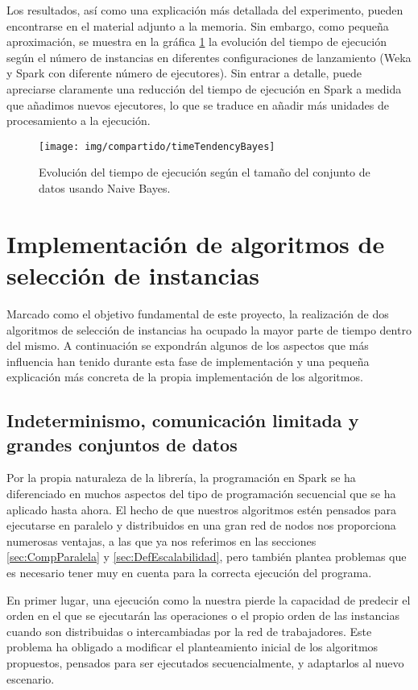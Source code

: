 Los resultados, así como una explicación más detallada del experimento, pueden encontrarse en el material adjunto a la memoria. Sin embargo, como pequeña aproximación, se muestra en la gráfica \ref{fig:img/compartido/timeTendencyBayes} la evolución del tiempo de ejecución según el número de instancias en diferentes configuraciones de lanzamiento (Weka y Spark con diferente número de ejecutores). Sin entrar a detalle, puede apreciarse claramente una reducción del tiempo de ejecución en Spark a medida que añadimos nuevos ejecutores, lo que se traduce en añadir más unidades de procesamiento a la ejecución. 

	\begin{figure}[!h]
		\centering
		\texttt{[image: img/compartido/timeTendencyBayes]}
		\caption{Evolución del tiempo de ejecución según el tamaño del conjunto de datos usando Naive Bayes.}\label{fig:img/compartido/timeTendencyBayes}
	\end{figure}

\section{Implementación de algoritmos de selección de instancias}

Marcado como el objetivo fundamental de este proyecto, la realización de dos algoritmos de selección de instancias ha ocupado la mayor parte de tiempo dentro del mismo. A continuación se expondrán algunos de los aspectos que más influencia han tenido durante esta fase de implementación y una pequeña explicación más concreta de la propia implementación de los algoritmos.


\subsection{Indeterminismo, comunicación limitada y grandes conjuntos de datos}

Por la propia naturaleza de la librería, la programación en Spark se ha diferenciado en muchos aspectos del tipo de programación secuencial que se ha aplicado hasta ahora. El hecho de que nuestros algoritmos estén pensados para ejecutarse en paralelo y distribuidos en una gran red de nodos nos proporciona numerosas ventajas, a las que ya nos referimos en las secciones \ref{sec:CompParalela} y \ref{sec:DefEscalabilidad}, pero también plantea problemas que es necesario tener muy en cuenta para la correcta ejecución del programa.

En primer lugar, una ejecución como la nuestra pierde la capacidad de predecir el orden en el que se ejecutarán las operaciones o el propio orden de las instancias cuando son distribuidas o intercambiadas por la red de trabajadores. Este problema ha obligado a modificar el planteamiento inicial de los algoritmos propuestos, pensados para ser ejecutados secuencialmente, y adaptarlos al nuevo escenario.

